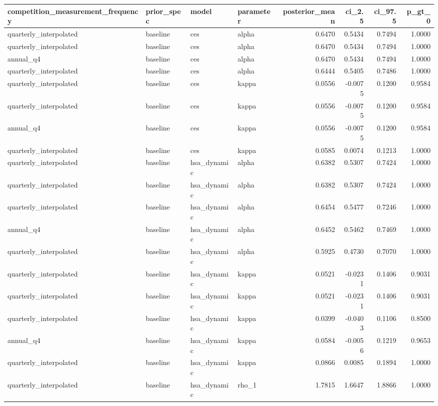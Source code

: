 \begin{tabular}{llllrrrr}
\toprule
competition\_measurement\_frequency & prior\_spec & model & parameter & posterior\_mean & ci\_2.5 & ci\_97.5 & p\_gt\_0 \\
\midrule
quarterly\_interpolated & baseline & ces & alpha & 0.6470 & 0.5434 & 0.7494 & 1.0000 \\
quarterly\_interpolated & baseline & ces & alpha & 0.6470 & 0.5434 & 0.7494 & 1.0000 \\
annual\_q4 & baseline & ces & alpha & 0.6470 & 0.5434 & 0.7494 & 1.0000 \\
quarterly\_interpolated & baseline & ces & alpha & 0.6444 & 0.5405 & 0.7486 & 1.0000 \\
quarterly\_interpolated & baseline & ces & kappa & 0.0556 & -0.0075 & 0.1200 & 0.9584 \\
quarterly\_interpolated & baseline & ces & kappa & 0.0556 & -0.0075 & 0.1200 & 0.9584 \\
annual\_q4 & baseline & ces & kappa & 0.0556 & -0.0075 & 0.1200 & 0.9584 \\
quarterly\_interpolated & baseline & ces & kappa & 0.0585 & 0.0074 & 0.1213 & 1.0000 \\
quarterly\_interpolated & baseline & hsa\_dynamic & alpha & 0.6382 & 0.5307 & 0.7424 & 1.0000 \\
quarterly\_interpolated & baseline & hsa\_dynamic & alpha & 0.6382 & 0.5307 & 0.7424 & 1.0000 \\
quarterly\_interpolated & baseline & hsa\_dynamic & alpha & 0.6454 & 0.5477 & 0.7246 & 1.0000 \\
annual\_q4 & baseline & hsa\_dynamic & alpha & 0.6452 & 0.5462 & 0.7469 & 1.0000 \\
quarterly\_interpolated & baseline & hsa\_dynamic & alpha & 0.5925 & 0.4730 & 0.7070 & 1.0000 \\
quarterly\_interpolated & baseline & hsa\_dynamic & kappa & 0.0521 & -0.0231 & 0.1406 & 0.9031 \\
quarterly\_interpolated & baseline & hsa\_dynamic & kappa & 0.0521 & -0.0231 & 0.1406 & 0.9031 \\
quarterly\_interpolated & baseline & hsa\_dynamic & kappa & 0.0399 & -0.0403 & 0.1106 & 0.8500 \\
annual\_q4 & baseline & hsa\_dynamic & kappa & 0.0584 & -0.0056 & 0.1219 & 0.9653 \\
quarterly\_interpolated & baseline & hsa\_dynamic & kappa & 0.0866 & 0.0085 & 0.1894 & 1.0000 \\
quarterly\_interpolated & baseline & hsa\_dynamic & rho\_1 & 1.7815 & 1.6647 & 1.8866 & 1.0000 \\

\end{tabular}
